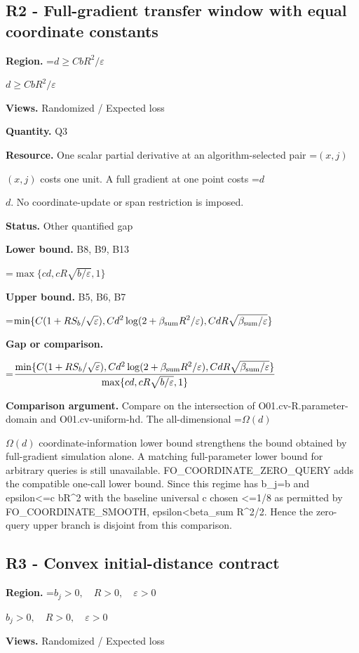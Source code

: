 \documentclass[10pt,a4paper]{article}
\newcommand{\AtlasMath}[1]{\par\begingroup\centering\setbox0=\hbox{$\displaystyle #1$}\ifdim\wd0>1.4\linewidth\typeout{ATLAS WIDE FORMULA: \the\wd0}\fi\ifdim\wd0>\linewidth\resizebox{\linewidth}{!}{\box0}\else\box0\fi\par\endgroup}
\newcommand{\AtlasInlineMath}[1]{\begingroup\setbox0=\hbox{$#1$}\ifdim\wd0>.4\linewidth\endgroup\AtlasMath{#1}\else\endgroup$#1$\fi}
\begin{document}
\subsection{R2 - Full-gradient transfer window with equal coordinate constants}
\textbf{Region.} \AtlasInlineMath{d\ge CbR^2/\varepsilon}

\textbf{Views.} Randomized / Expected loss

\textbf{Quantity.} Q3

\textbf{Resource.} One scalar partial derivative at an algorithm-selected pair \AtlasInlineMath{(x,j)} costs one unit. A full gradient at one point costs \AtlasInlineMath{d}. No coordinate-update or span restriction is imposed.

\textbf{Status.} Other quantified gap

\textbf{Lower bound.} B8, B9, B13

\AtlasMath{\max\{cd,cR\sqrt{b/\varepsilon},1\}}
\textbf{Upper bound.} B5, B6, B7

\AtlasMath{\min\{C(1+RS_b/\sqrt\varepsilon),Cd^2\log(2+\beta_{\rm sum}R^2/\varepsilon),CdR\sqrt{\beta_{\rm sum}/\varepsilon}\}}
\textbf{Gap or comparison.} 
\AtlasMath{\frac{\min\{C(1+RS_b/\sqrt\varepsilon),Cd^2\log(2+\beta_{\rm sum}R^2/\varepsilon),CdR\sqrt{\beta_{\rm sum}/\varepsilon}\}}{\max\{cd,cR\sqrt{b/\varepsilon},1\}}}


\textbf{Comparison argument.} Compare on the intersection of O01.cv-R.parameter-domain and O01.cv-uniform-hd. The all-dimensional \AtlasInlineMath{\Omega(d)} coordinate-information lower bound strengthens the bound obtained by full-gradient simulation alone. A matching full-parameter lower bound for arbitrary queries is still unavailable. FO\_\allowbreak{}COORDINATE\_\allowbreak{}ZERO\_\allowbreak{}QUERY adds the compatible one-call lower bound. Since this regime has b\_\allowbreak{}j=b and epsilon<=c bR\textasciicircum{}2 with the baseline universal c chosen <=1/8 as permitted by FO\_\allowbreak{}COORDINATE\_\allowbreak{}SMOOTH, epsilon<beta\_\allowbreak{}sum R\textasciicircum{}2/2. Hence the zero-query upper branch is disjoint from this comparison.

\subsection{R3 - Convex initial-distance contract}
\textbf{Region.} \AtlasInlineMath{b_j>0,\quad R>0,\quad\varepsilon>0}

\textbf{Views.} Randomized / Expected loss
\end{document}
